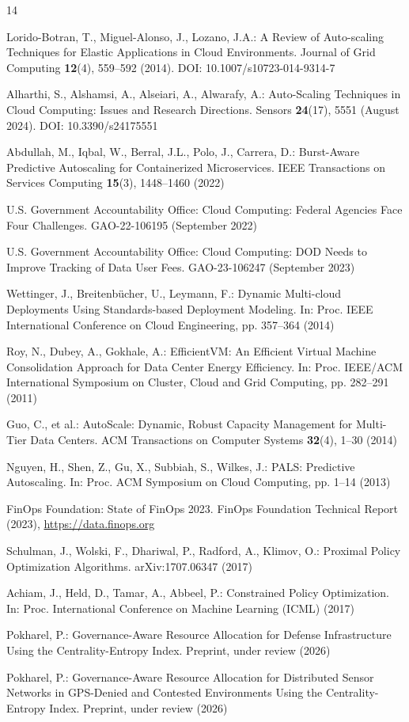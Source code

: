 \documentclass[runningheads]{llncs}
\begin{document}
\begin{thebibliography}{14}

 Lorido-Botran, T., Miguel-Alonso, J., Lozano, J.A.: A Review of Auto-scaling Techniques for Elastic Applications in Cloud Environments. Journal of Grid Computing \textbf{12}(4), 559--592 (2014). DOI: 10.1007/s10723-014-9314-7

 Alharthi, S., Alshamsi, A., Alseiari, A., Alwarafy, A.: Auto-Scaling Techniques in Cloud Computing: Issues and Research Directions. Sensors \textbf{24}(17), 5551 (August 2024). DOI: 10.3390/s24175551

 Abdullah, M., Iqbal, W., Berral, J.L., Polo, J., Carrera, D.: Burst-Aware Predictive Autoscaling for Containerized Microservices. IEEE Transactions on Services Computing \textbf{15}(3), 1448--1460 (2022)

 U.S. Government Accountability Office: Cloud Computing: Federal Agencies Face Four Challenges. GAO-22-106195 (September 2022)

 U.S. Government Accountability Office: Cloud Computing: DOD Needs to Improve Tracking of Data User Fees. GAO-23-106247 (September 2023)

 Wettinger, J., Breitenb\"{u}cher, U., Leymann, F.: Dynamic Multi-cloud Deployments Using Standards-based Deployment Modeling. In: Proc. IEEE International Conference on Cloud Engineering, pp. 357--364 (2014)

 Roy, N., Dubey, A., Gokhale, A.: EfficientVM: An Efficient Virtual Machine Consolidation Approach for Data Center Energy Efficiency. In: Proc. IEEE/ACM International Symposium on Cluster, Cloud and Grid Computing, pp. 282--291 (2011)

 Guo, C., et al.: AutoScale: Dynamic, Robust Capacity Management for Multi-Tier Data Centers. ACM Transactions on Computer Systems \textbf{32}(4), 1--30 (2014)

 Nguyen, H., Shen, Z., Gu, X., Subbiah, S., Wilkes, J.: PALS: Predictive Autoscaling. In: Proc. ACM Symposium on Cloud Computing, pp. 1--14 (2013)

 FinOps Foundation: State of FinOps 2023. FinOps Foundation Technical Report (2023), \url{https://data.finops.org}

 Schulman, J., Wolski, F., Dhariwal, P., Radford, A., Klimov, O.: Proximal Policy Optimization Algorithms. arXiv:1707.06347 (2017)

 Achiam, J., Held, D., Tamar, A., Abbeel, P.: Constrained Policy Optimization. In: Proc. International Conference on Machine Learning (ICML) (2017)

 Pokharel, P.: Governance-Aware Resource Allocation for Defense Infrastructure Using the Centrality-Entropy Index. Preprint, under review (2026)

 Pokharel, P.: Governance-Aware Resource Allocation for Distributed Sensor Networks in GPS-Denied and Contested Environments Using the Centrality-Entropy Index. Preprint, under review (2026)

\end{thebibliography}
\end{document}
